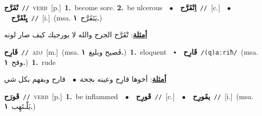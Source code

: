 \documentclass[10pt,a4paper,twoside]{article} %
\begin{document}
\begin{multicols}{2}
{\setlength\topsep{0pt}\textbf{\foreignlanguage{arabic}{تْقَرَّح}}\ {\color{gray}\texttt{//}\color{black}}\ \textsc{verb}\ [p.]\ \textbf{1.}~become sore.  \textbf{2.}~be ulcerous\ \ $\bullet$\ \ \setlength\topsep{0pt}\textbf{\foreignlanguage{arabic}{اِتْقَرَّح}}\ {\color{gray}\texttt{//}\color{black}}\ [c.]\ \ $\bullet$\ \ \setlength\topsep{0pt}\textbf{\foreignlanguage{arabic}{يِتْقَرَّح}}\ {\color{gray}\texttt{//}\color{black}}\ [i.]\ \color{gray}(msa. \foreignlanguage{arabic}{يَتَقَرَّح}~\foreignlanguage{arabic}{\textbf{١.}})\color{black}\  \begin{flushright}\color{gray}\foreignlanguage{arabic}{\textbf{\underline{\foreignlanguage{arabic}{أمثلة}}}: تْقَرَّح الجرح والله لا يورجيك كيف صار لونه}\end{flushright}\color{black}} \vspace{2mm}

{\setlength\topsep{0pt}\textbf{\foreignlanguage{arabic}{قَارِح}}\ {\color{gray}\texttt{//}\color{black}}\ \textsc{adj}\ [m.]\ \color{gray}(msa. \foreignlanguage{arabic}{فَصيح وبليغ}~\foreignlanguage{arabic}{\textbf{١.}})\color{black}\ \textbf{1.}~eloquent\ \ $\smblkdiamond$\ \ \setlength\topsep{0pt}\textbf{\foreignlanguage{arabic}{قَارِح}}\ {\color{gray}\texttt{/(q)aːriħ/}\color{black}}\ \color{gray}(msa. \foreignlanguage{arabic}{وقح}~\foreignlanguage{arabic}{\textbf{١.}})\color{black}\ \textbf{1.}~rude\  \begin{flushright}\color{gray}\foreignlanguage{arabic}{\textbf{\underline{\foreignlanguage{arabic}{أمثلة}}}: أخوها قارِح وعينه بجحة\ $\bullet$\ \  قارح وبفهم بكل شي}\end{flushright}\color{black}} \vspace{2mm}

{\setlength\topsep{0pt}\textbf{\foreignlanguage{arabic}{قَورَح}}\ {\color{gray}\texttt{//}\color{black}}\ \textsc{verb}\ [p.]\ \textbf{1.}~be inflammed\ \ $\bullet$\ \ \setlength\topsep{0pt}\textbf{\foreignlanguage{arabic}{قَورِح}}\ {\color{gray}\texttt{//}\color{black}}\ [c.]\ \ $\bullet$\ \ \setlength\topsep{0pt}\textbf{\foreignlanguage{arabic}{يقَورِح}}\ {\color{gray}\texttt{//}\color{black}}\ [i.]\ \color{gray}(msa. \foreignlanguage{arabic}{يَلْـتَهِب}~\foreignlanguage{arabic}{\textbf{١.}})\color{black}\ } \vspace{2mm}


\end{multicols}
\end{document}
